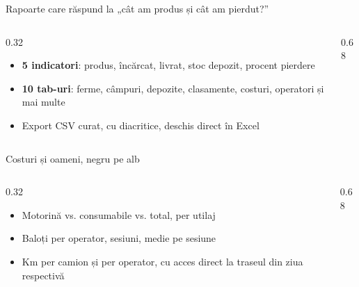\documentclass[aspectratio=169,10pt]{beamer}
\begin{document}
\begin{frame}{Rapoarte care răspund la „cât am produs și cât am pierdut?''}
  \begin{columns}[T]
    \begin{column}{0.32\linewidth}
      \vspace{0.3cm}
      \begin{itemize}
        \item \textbf{5 indicatori}: produs, încărcat, livrat, stoc depozit, procent pierdere
        \item \textbf{10 tab-uri}: ferme, câmpuri, depozite, clasamente, costuri, operatori și mai multe
        \item Export CSV curat, cu diacritice, deschis direct în Excel
      \end{itemize}
    \end{column}
    \begin{column}{0.68\linewidth}
    \end{column}
  \end{columns}
\end{frame}

\begin{frame}{Costuri și oameni, negru pe alb}
  \begin{columns}[T]
    \begin{column}{0.32\linewidth}
      \vspace{0.3cm}
      \begin{itemize}
        \item Motorină vs. consumabile vs. total, per utilaj
        \item Baloți per operator, sesiuni, medie pe sesiune
        \item Km per camion și per operator, cu acces direct la traseul din ziua respectivă
      \end{itemize}
    \end{column}
    \begin{column}{0.68\linewidth}
    \end{column}
  \end{columns}
\end{frame}
\end{document}
